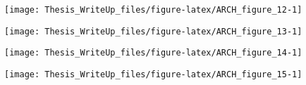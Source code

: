 \documentclass[11pt,preprint, authoryear]{elsarticle}
\let\origfigure\figure
\let\endorigfigure\endfigure
\renewenvironment{figure}[1][2] {
    \expandafter\origfigure\expandafter[H]
} {
    \endorigfigure
}
\numberwithin{equation}{section}
\numberwithin{figure}{section}
\numberwithin{table}{section}
\begin{document}
\begin{figure}[H]

{\centering \texttt{[image: Thesis\_WriteUp\_files/figure-latex/ARCH\_figure\_12-1]} 

}

\caption{Autocorrelation and partial-autocorrelation functions of model 5 - EGARCH(1,1) -  residuals \label{Figure9}}\label{fig:ARCH_figure_12}
\end{figure}

\begin{figure}[H]

{\centering \texttt{[image: Thesis\_WriteUp\_files/figure-latex/ARCH\_figure\_13-1]} 

}

\caption{Autocorrelation and partial-autocorrelation functions of model 6 - ARMA(1,0) ARCH(1,0) - residuals \label{Figure9}}\label{fig:ARCH_figure_13}
\end{figure}

\begin{figure}[H]

{\centering \texttt{[image: Thesis\_WriteUp\_files/figure-latex/ARCH\_figure\_14-1]} 

}

\caption{Autocorrelation and partial-autocorrelation functions of model 7 - ARCH(1,0) - residuals \label{Figure9}}\label{fig:ARCH_figure_14}
\end{figure}

\begin{figure}[H]

{\centering \texttt{[image: Thesis\_WriteUp\_files/figure-latex/ARCH\_figure\_15-1]} 

}

\caption{Autocorrelation and partial-autocorrelation functions of model 8 - ARMA(2,0) GARCH(1,1) - residuals \label{Figure9}}\label{fig:ARCH_figure_15}
\end{figure}
\end{document}
